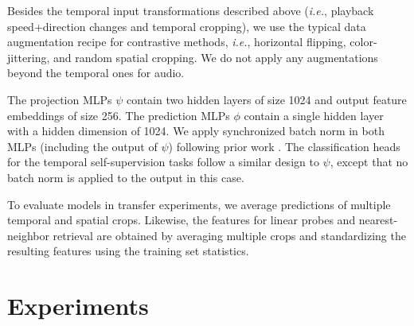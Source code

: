 \documentclass[letterpaper]{article} %
\newcommand{\ie}{\emph{i.e.}}
\begin{document}
Besides the temporal input transformations described above (\ie, playback speed+direction changes and temporal cropping), we use the typical data augmentation recipe for contrastive methods, \ie, horizontal flipping, color-jittering, and random spatial cropping.
We do not apply any augmentations beyond the temporal ones for audio.

The projection MLPs $\psi$ contain two hidden layers of size 1024 and output feature embeddings of size 256.
The prediction MLPs $\phi$ contain a single hidden layer with a hidden dimension of 1024.
We apply synchronized batch norm in both MLPs (including the output of $\psi$) following prior work \cite{chen2020simple}.
The classification heads for the temporal self-supervision tasks follow a similar design to $\psi$, except that no batch norm is applied to the output in this case.

To evaluate models in transfer experiments, we average predictions of multiple temporal and spatial crops.
Likewise, the features for linear probes and nearest-neighbor retrieval are obtained by averaging multiple crops and standardizing the resulting features using the training set statistics.




\section{Experiments}
\end{document}

